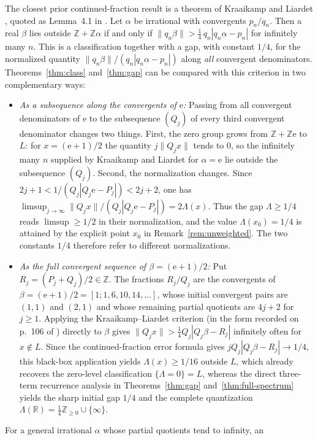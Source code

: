 \documentclass[11pt]{article}
\theoremstyle{definition}
\theoremstyle{remark}
\newcommand{\R}{\mathbb{R}}
\newcommand{\Z}{\mathbb{Z}}
\newcommand{\ee}{\mathrm{e}}
\newcommand{\Lam}{\Lambda}
\begin{document}
The closest prior continued-fraction result is a theorem of Kraaikamp and
Liardet \cite{KL}, quoted as Lemma~4.1 in \cite{BDS}. Let $\alpha$ be irrational
with convergents $p_n/q_n$. Then a real $\beta$ lies outside
$\Z+\Z\alpha$ if and only if
$\|q_n\beta\|>\tfrac14\,q_n|q_n\alpha-p_n|$ for infinitely many $n$. This
is a classification together with a gap, with constant $1/4$, for the
normalized quantity $\|q_n\beta\|/(q_n|q_n\alpha-p_n|)$ along \emph{all}
convergent denominators. Theorems~\ref{thm:class} and~\ref{thm:gap} can be
compared with this criterion in two complementary ways:
\begin{itemize}[leftmargin=1.8em]
\item \emph{As a subsequence along the convergents of $\ee$:} Passing from all
convergent denominators of $\ee$ to the subsequence $(Q_j)$ of every third
convergent denominator changes two things. First, the zero group grows from
$\Z+\Z\ee$ to $L$: for $x=(\ee+1)/2$ the quantity $j\|Q_jx\|$ tends to $0$, so
the infinitely many $n$ supplied by Kraaikamp and Liardet for $\alpha=\ee$ lie
outside the subsequence $(Q_j)$. Second, the normalization changes. Since
$2j+1<1/(Q_j|Q_j\ee-P_j|)<2j+2$, one has
$\limsup_{j\to\infty}\|Q_jx\|/(Q_j|Q_j\ee-P_j|)=2\Lam(x)$. Thus the gap
$\Lam\ge1/4$ reads $\limsup\ge1/2$ in their normalization, and the value
$\Lam(x_0)=1/4$ is attained by the explicit point $x_0$ in
Remark~\ref{rem:unweighted}. The two constants $1/4$ therefore refer to
different normalizations.
\item \emph{As the full convergent sequence of $\beta=(\ee+1)/2$:} Put
$R_j=(P_j+Q_j)/2\in\Z$. The fractions $R_j/Q_j$ are the convergents of
$\beta=(\ee+1)/2=[1;1,6,10,14,\dots]$, whose initial convergent pairs are
$(1,1)$ and $(2,1)$ and whose remaining partial quotients are $4j+2$ for
$j\ge1$. Applying the Kraaikamp--Liardet criterion \cite{KL} (in the form
recorded on p.~106 of \cite{BDS}) directly to $\beta$ gives
$\|Q_jx\|>\tfrac14 Q_j|Q_j\beta-R_j|$ infinitely often for $x\notin L$. Since
the continued-fraction error formula gives $jQ_j|Q_j\beta-R_j|\to1/4$, this
black-box application yields $\Lam(x)\ge1/16$ outside $L$, which already
recovers the zero-level classification $\{\Lam=0\}=L$, whereas the direct
three-term recurrence analysis in Theorems~\ref{thm:gap}
and~\ref{thm:full-spectrum} yields the sharp initial gap $1/4$ and the complete
quantization $\Lam(\R)=\frac14\Z_{\ge0}\cup\{\infty\}$.
\end{itemize}
For a general irrational $\alpha$ whose partial quotients tend to infinity, an
\end{document}
